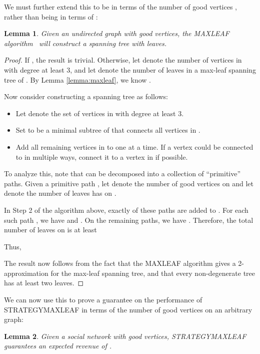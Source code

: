 \documentclass[letterpaper,twoside]{article}
\newtheorem{lemma}{Lemma}
\newcommand{\maxleaf}{\textrm{M{\scriptsize AX}\-L{\scriptsize EAF}}}
\newcommand{\strategyml}{\textrm{S{\scriptsize TRATEGY}\-M{\scriptsize AX}\-L{\scriptsize EAF}}}
\begin{document}
We must further extend this to be in terms of the number of good
vertices , rather than being in terms of :
\begin{lemma} \label{lem:leaves}
  Given an undirected graph  with  good vertices, the
  \maxleaf{} algorithm~\cite{LR98} will construct a spanning tree
  with  leaves.
\end{lemma}

\begin{proof}
  If , the result is trivial. Otherwise, let  denote the
  number of vertices in  with degree at least 3, and let 
  denote the number of leaves in a max-leaf spanning tree of . By
  Lemma \ref{lemma:maxleaf}, we know .

  Now consider constructing a spanning tree as follows:
  \begin{itemize}
    \item[1.] Let  denote the set of vertices in  with degree at
    least 3.
    \item[2.] Set  to be a minimal subtree of  that connects
    all vertices in .
    \item[3.] Add all remaining vertices in  to  one at a time. If
    a vertex  could be connected to  in multiple ways, connect
    it to a vertex in  if possible.
  \end{itemize}
  To analyze this, note that  can be decomposed into a
  collection of ``primitive'' paths. Given a primitive path , let
   denote the number of good vertices on  and let 
  denote the number of leaves  has on .

  In Step 2 of the algorithm above, exactly  of these paths
  are added to . For each such path , we have  and
  . On the remaining paths, we have . Therefore,
  the total number of leaves on  is at least
  
  Thus,
  
  The result now follows from the
  fact that the \maxleaf{} algorithm gives a 2-approximation for the
  max-leaf spanning tree, and that every non-degenerate tree has at least
  two leaves.
\end{proof}

We can now use this to prove a guarantee on the performance of
\strategyml{} in terms of the number of good vertices on an arbitrary graph:
\begin{lemma} \label{lem:strategybound}
Given a social network  with  good vertices, \strategyml{}
guarantees an expected revenue of .
\end{lemma}
\end{document}
